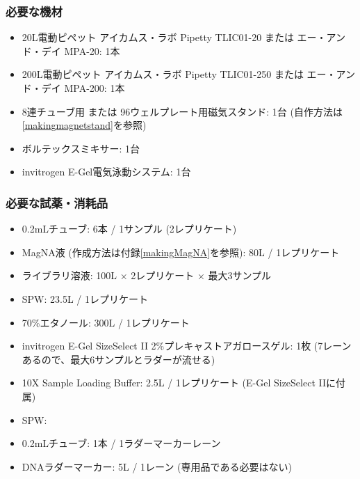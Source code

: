 \documentclass[titlepage,10pt,a4paper,uplatex]{jsbook}
\begin{document}
\subsubsection{必要な機材}
\begin{itemize}
\item 20{\textmu}L電動ピペット アイカムス・ラボ Pipetty TLIC01-20 または エー・アンド・デイ MPA-20: 1本
\item 200{\textmu}L電動ピペット アイカムス・ラボ Pipetty TLIC01-250 または エー・アンド・デイ MPA-200: 1本
\item 8連チューブ用 または 96ウェルプレート用磁気スタンド: 1台 (自作方法は\ref{makingmagnetstand}を参照)
\item ボルテックスミキサー: 1台
\item invitrogen E-Gel電気泳動システム: 1台
\end{itemize}

\subsubsection{必要な試薬・消耗品}
\begin{itemize}
\item 0.2mLチューブ: 6本 / 1サンプル (2レプリケート)
\item MagNA液 (作成方法は付録\ref{makingMagNA}を参照): 80{\textmu}L / 1レプリケート
\item ライブラリ溶液: 100{\textmu}L × 2レプリケート × 最大3サンプル
\item SPW: 23.5{\textmu}L / 1レプリケート
\item 70\%エタノール: 300{\textmu}L / 1レプリケート
\item invitrogen E-Gel SizeSelect II 2\%プレキャストアガロースゲル: 1枚 (7レーンあるので、最大6サンプルとラダーが流せる)
\item 10X Sample Loading Buffer: 2.5{\textmu}L / 1レプリケート (E-Gel SizeSelect IIに付属)
\item SPW: 
\item 0.2mLチューブ: 1本 / 1ラダーマーカーレーン
\item DNAラダーマーカー: 5{\textmu}L / 1レーン (専用品である必要はない)
\end{itemize}
\end{document}
